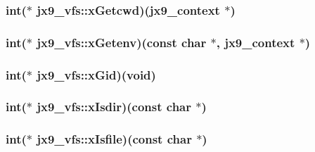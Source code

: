 \hypertarget{structjx9__vfs_a624d05f161753930b74983f0f3a8598e}{
\subsubsection[{x\-Getcwd}]{\setlength{\rightskip}{0pt plus 5cm}int($\ast$ jx9\-\_\-vfs\-::x\-Getcwd)({\bf jx9\-\_\-context} $\ast$)}}\label{da/d75/structjx9__vfs_a624d05f161753930b74983f0f3a8598e}
\hypertarget{structjx9__vfs_a72dc5b08732765d1140fe3d44789893c}{
\subsubsection[{x\-Getenv}]{\setlength{\rightskip}{0pt plus 5cm}int($\ast$ jx9\-\_\-vfs\-::x\-Getenv)(const char $\ast$, {\bf jx9\-\_\-context} $\ast$)}}\label{da/d75/structjx9__vfs_a72dc5b08732765d1140fe3d44789893c}
\hypertarget{structjx9__vfs_ac6efe0c20c468678c20efdb38010d47f}{
\subsubsection[{x\-Gid}]{\setlength{\rightskip}{0pt plus 5cm}int($\ast$ jx9\-\_\-vfs\-::x\-Gid)(void)}}\label{da/d75/structjx9__vfs_ac6efe0c20c468678c20efdb38010d47f}
\hypertarget{structjx9__vfs_afe0da137298de6c6613fbf0f8dd00746}{
\subsubsection[{x\-Isdir}]{\setlength{\rightskip}{0pt plus 5cm}int($\ast$ jx9\-\_\-vfs\-::x\-Isdir)(const char $\ast$)}}\label{da/d75/structjx9__vfs_afe0da137298de6c6613fbf0f8dd00746}
\hypertarget{structjx9__vfs_a5a50796330187bb369959005270adeb2}{
\subsubsection[{x\-Isfile}]{\setlength{\rightskip}{0pt plus 5cm}int($\ast$ jx9\-\_\-vfs\-::x\-Isfile)(const char $\ast$)}}\label{da/d75/structjx9__vfs_a5a50796330187bb369959005270adeb2}
